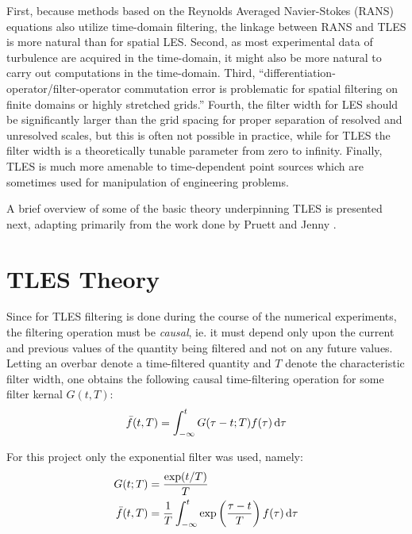 First, because methods based on the Reynolds Averaged Navier-Stokes (RANS) equations also utilize time-domain filtering, the linkage between RANS and TLES is more natural than for spatial LES. Second, as most experimental data of turbulence are acquired in the time-domain, it might also be more natural to carry out computations in the time-domain. Third, ``differentiation-operator/filter-operator commutation error is problematic for spatial filtering on finite domains or highly stretched grids.''\cite{Pruett2008} Fourth, the filter width for LES should be significantly larger than the grid spacing for proper separation of resolved and unresolved scales, but this is often not possible in practice, while for TLES the filter width is a theoretically tunable parameter from zero to infinity. Finally, TLES is much more amenable to time-dependent point sources which are sometimes used for manipulation of engineering problems.

A brief overview of some of the basic theory underpinning TLES is presented next, adapting primarily from the work done by Pruett \cite{Pruett2008} and Jenny \cite{Jenny2016}.

\section{TLES Theory} \label{TLES_theory}

Since for TLES filtering is done during the course of the numerical experiments, the filtering operation must be \emph{causal}, ie. it must depend only upon the current and previous values of the quantity being filtered and not on any future values. Letting an overbar denote a time-filtered quantity and $T$ denote the characteristic filter width, one obtains the following causal time-filtering operation for some filter kernal $G(t,T)$:
\begin{equation}
\bar{f}(t,T)=\int_{-\infty}^{t}G(\tau -t;T)f(\tau)\mathop{}\!\mathrm{d}\tau
\end{equation}

For this project only the exponential filter was used, namely:
\begin{equation}
\begin{split}
G(t;T)&=\frac{\exp(t/T)}{T} \\
\bar{f}(t,T)&=\frac{1}{T}\int_{-\infty}^{t}\exp\left(\frac{\tau-t}{T}\right)f(\tau)\mathop{}\!\mathrm{d}\tau
\end{split}
\end{equation}


